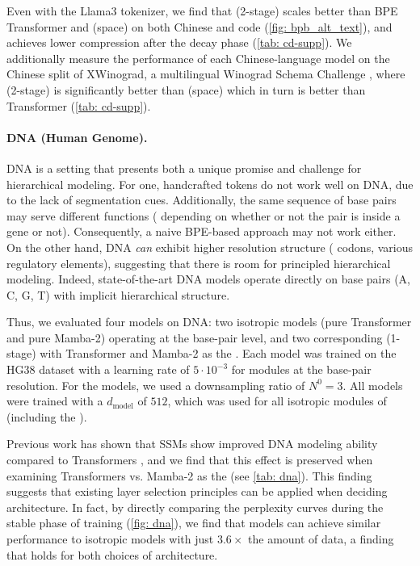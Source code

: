 Even with the Llama3 tokenizer, we find that \model{} (2-stage) scales better than BPE Transformer and \model{} (space) on both Chinese and code (\cref{fig: bpb_alt_text}), and achieves lower compression after the decay phase (\cref{tab: cd-supp}). We additionally measure the performance of each Chinese-language model on the Chinese split of XWinograd, a multilingual Winograd Schema Challenge \citep{xwinograd}, where \model{} (2-stage) is significantly better than \model{} (space) which in turn is better than Transformer (\cref{tab: cd-supp}).





\paragraph{DNA (Human Genome).} DNA is a setting that presents both a unique promise and challenge for hierarchical modeling. 
For one, handcrafted tokens do not work well on DNA, due to the lack of segmentation cues. 
Additionally, the same sequence of base pairs may serve different functions (\eg{} depending on whether or not the pair is inside a gene or not).
Consequently, a naive BPE-based approach may not work either. 
On the other hand, DNA \emph{can} exhibit higher resolution structure (\eg{} codons, various regulatory elements),
suggesting that there is room for principled hierarchical modeling.
Indeed, state-of-the-art DNA models \citep{Evo2} operate directly on base pairs (A, C, G, T) with implicit hierarchical structure.


Thus, we evaluated four models on DNA: two isotropic models (pure Transformer and pure Mamba-2) operating at the base-pair level, and two corresponding \model{} (1-stage) with Transformer and Mamba-2 as the \main{}. 
Each model was trained on the HG38 dataset with a learning rate of $5\cdot 10^{-3}$ for modules at the base-pair resolution. 
For the \model{} models, we used a downsampling ratio of $N^0 = 3$.
All models were trained with a $d_{\text{model}}$ of $512$, which was used for all isotropic modules of \model{} (including the \main{}).


Previous work has shown that SSMs show improved DNA modeling ability compared to Transformers \citep{Mamba}, and we find that this effect is preserved when examining Transformers vs. Mamba-2 as the \main{} (see \cref{tab: dna}). 
This finding suggests that existing layer selection principles can be applied when deciding \main{} architecture.
In fact, by directly comparing the perplexity curves during the stable phase of training (\cref{fig: dna}), we find that \model{} models can achieve similar performance to isotropic models with just $3.6\times$ the amount of data, a finding that holds for both choices of \main{} architecture.


